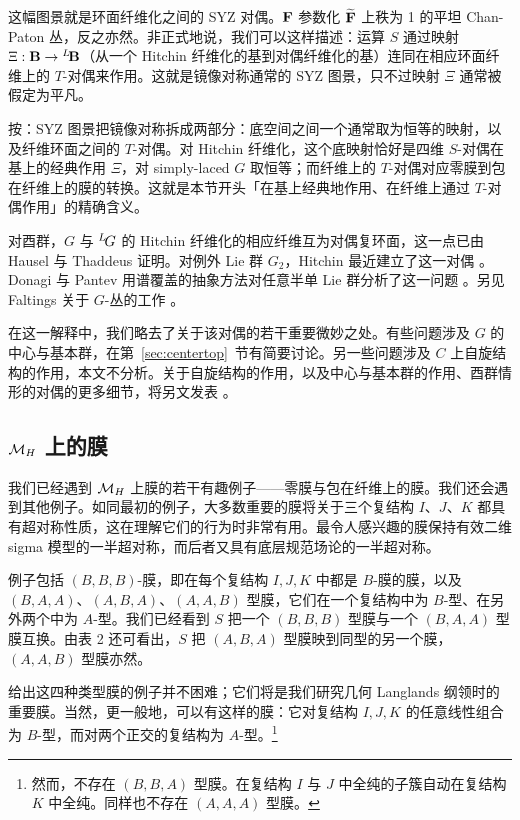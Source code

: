 这幅图景就是环面纤维化之间的 SYZ 对偶。${{{\mathbf{F}}}}$ 参数化 $\widetilde {{{\mathbf{F}}}}$ 上秩为 1 的平坦 Chan-Paton 丛，反之亦然。非正式地说，我们可以这样描述：运算 $S$ 通过映射 $\Xi:{{\mathbf{B}}}\to{}^L\negthinspace{{\mathbf{B}}}$（从一个 Hitchin 纤维化的基到对偶纤维化的基）连同在相应环面纤维上的 $T$-对偶来作用。这就是镜像对称通常的 SYZ 图景，只不过映射 $\Xi$ 通常被假定为平凡。

\begin{yizhu}[物理图像]
按：SYZ 图景把镜像对称拆成两部分：底空间之间一个通常取为恒等的映射，以及纤维环面之间的 $T$-对偶。对 Hitchin 纤维化，这个底映射恰好是四维 $S$-对偶在基上的经典作用 $\Xi$，对 simply-laced $G$ 取恒等；而纤维上的 $T$-对偶对应零膜到包在纤维上的膜的转换。这就是本节开头「在基上经典地作用、在纤维上通过 $T$-对偶作用」的精确含义。
\end{yizhu}

对酉群，$G$ 与 $^L\negthinspace G$ 的 Hitchin 纤维化的相应纤维互为对偶复环面，这一点已由 Hausel 与 Thaddeus \cite{ref21} 证明。对例外 Lie 群 $G_2$，Hitchin 最近建立了这一对偶 \cite{ref81}。Donagi 与 Pantev 用谱覆盖的抽象方法对任意半单 Lie 群分析了这一问题 \cite{ref82}。另见 Faltings 关于 $G$-丛的工作 \cite{ref83}。

在这一解释中，我们略去了关于该对偶的若干重要微妙之处。有些问题涉及 $G$ 的中心与基本群，在第~\ref{sec:centertop}~节有简要讨论。另一些问题涉及 $C$ 上自旋结构的作用，本文不分析。关于自旋结构的作用，以及中心与基本群的作用、酉群情形的对偶的更多细节，将另文发表 \cite{ref26}。

\subsection{${{{\mathcal{M}}}_H}$ 上的膜}

\label{sec:mhbranes}

我们已经遇到 ${{{\mathcal{M}}}_H}$ 上膜的若干有趣例子——零膜与包在纤维上的膜。我们还会遇到其他例子。如同最初的例子，大多数重要的膜将关于三个复结构 $I$、$J$、$K$ 都具有超对称性质，这在理解它们的行为时非常有用。最令人感兴趣的膜保持有效二维 sigma 模型的一半超对称，而后者又具有底层规范场论的一半超对称。

例子包括 $(B,B,B)$-膜，即在每个复结构 $I,J,K$ 中都是 $B$-膜的膜，以及 $(B,A,A)$、$(A,B,A)$、$(A,A,B)$ 型膜，它们在一个复结构中为 $B$-型、在另外两个中为 $A$-型。我们已经看到 $S$ 把一个 $(B,B,B)$ 型膜与一个 $(B,A,A)$ 型膜互换。由表 2 还可看出，$S$ 把 $(A,B,A)$ 型膜映到同型的另一个膜，$(A,A,B)$ 型膜亦然。

给出这四种类型膜的例子并不困难；它们将是我们研究几何 Langlands 纲领时的重要膜。当然，更一般地，可以有这样的膜：它对复结构 $I,J,K$ 的任意线性组合为 $B$-型，而对两个正交的复结构为 $A$-型。\footnote{然而，不存在 $(B,B,A)$ 型膜。在复结构 $I$ 与 $J$ 中全纯的子簇自动在复结构 $K$ 中全纯。同样也不存在 $(A,A,A)$ 型膜。}

